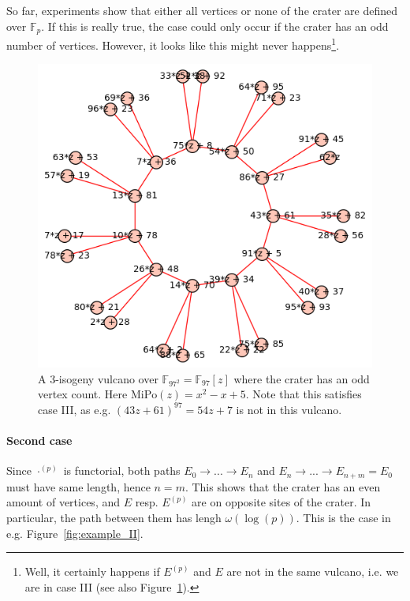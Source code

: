 \documentclass{scrartcl}
\newcommand{\F}{\mathbb{F}}
\theoremstyle{definition}
\begin{document}
So far, experiments show that either all vertices or none of the crater are defined over $\F_p$.
If this is really true, the case could only occur if the crater has an odd number of vertices.
However, it looks like this might never happens\footnote{Well, it certainly happens if $E^{(p)}$ and $E$ are not in the same vulcano, i.e. we are in case III (see also Figure~\ref{fig:example_odd_crater}).}.
\begin{figure}
    \includegraphics{./example_odd_crater.png}
    \caption{\label{fig:example_odd_crater} A 3-isogeny vulcano over $\F_{97^2} = \F_{97}[z]$ where the crater has an odd vertex count. Here $\mathrm{MiPo}(z) = x^2 - x + 5$. Note that this satisfies case III, as e.g. $(43z + 61)^{97} = 54z + 7$ is not in this vulcano.}
\end{figure}

\paragraph*{Second case} Since $\cdot^{(p)}$ is functorial, both paths $E_0 \to ... \to E_n$ and $E_n \to ... \to E_{n + m} = E_0$ must have same length, hence $n = m$.
This shows that the crater has an even amount of vertices, and $E$ resp. $E^{(p)}$ are on opposite sites of the crater.
In particular, the path between them has lengh $\omega(\log(p))$.
This is the case in e.g. Figure~\ref{fig:example_II}.
\end{document}
